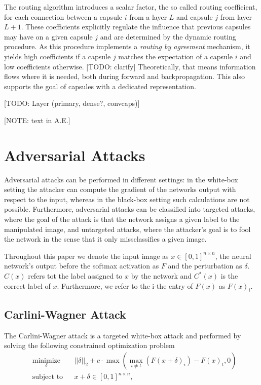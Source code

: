 \documentclass{article}
\begin{document}
The routing algorithm introduces a scalar factor, the so called routing coefficient, for each connection between a capsule $i$ from a layer $L$ and capsule $j$ from layer $L+1$. These coefficients explicitly regulate the influence that previous capsules may have on a given capsule $j$ and are determined by the dynamic routing procedure. As this procedure implements a \textit{routing by agreement} mechanism, it yields high coefficients if a capsule $j$ matches the expectation of a capsule $i$ and low coefficients otherwise. [TODO: clarify] Theoretically, that means information flows where it is needed, both during forward and backpropagation. This also supports the goal of capsules with a dedicated representation.

[TODO: Layer (primary, dense?, convcaps)]

[NOTE: text in A.E.]



\section{Adversarial Attacks}
\label{lab:attacks}

Adversarial attacks can be performed in different settings: in the white-box setting the attacker can compute the gradient of the networks output with respect to the input, whereas in the black-box setting such calculations are not possible. Furthermore, adversarial attacks can be classified into targeted attacks, where the goal of the attack is that the network assigns a given label to the manipulated image, and untargeted attacks, where the attacker's goal is to fool the network in the sense that it only missclassifies a given image.

Throughout this paper we denote the input image as $x\in [0,1]^{n\times n}$, the neural network's output before the softmax activation as $F$ and the perturbation as $\delta$. $C(x)$ refers tot the label assigned to $x$ by the network and $C^*(x)$ is the correct label of $x$. Furthermore, we refer to the i-the entry of $F(x)$ as $F(x)_i$.

\subsection{Carlini-Wagner Attack}

The Carlini-Wagner attack \cite{carlini} is a targeted white-box attack and performed by solving the following constrained optimization problem
\begin{equation}
	\begin{aligned}
	& \underset{\delta}{\text{minimize}}
	& & ||\delta||_2 + c \cdot \max(\max_{i\neq t}(F(x+\delta)_i)-F(x)_t, 0) \\
	& \text{subject to}
	& & x+\delta \in [0,1]^{n \times n},
	\end{aligned}
\end{equation}
\end{document}
